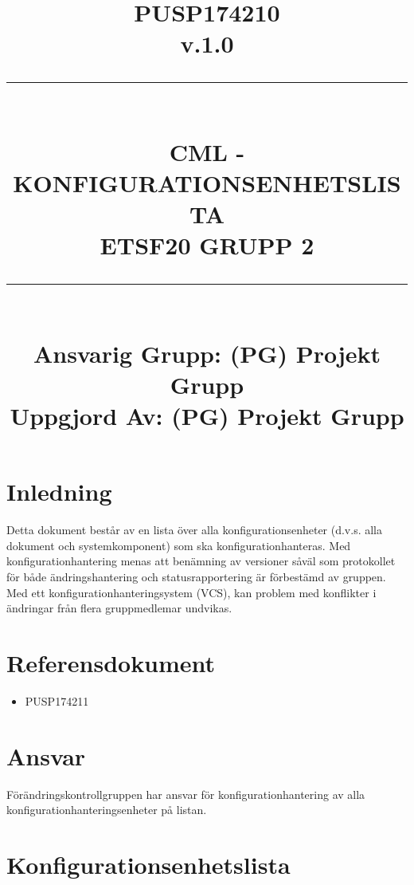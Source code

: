 \documentclass[paper=a4, fontsize=11pt,twoside]{article}
\title{
		\documentNumber{#1}																						
		\documentVersion{#2}																				
		\HRule{0.5pt} \\ %
		\LARGE \textbf{\uppercase{#3}} \\
		\large \textbf{\uppercase{ETSF20 Grupp 2}} 
		\HRule{2pt} \\ [1.5cm]    
		\normalsize            
		\documentResponsible{#4} \\ 
		\documentCreator{#4}  
	}
\newcommand{\HRule}[1]{\rule{\linewidth}{#1}}
\newcommand{\documentNumber}[1]{\centering PUSP1742#1 \\[1.0cm]}
\newcommand{\documentVersion}[1]{\centering \small{v.#1} \\[1.0cm]}
\newcommand{\documentResponsible}[1]{\centering  Ansvarig Grupp: #1}
\newcommand{\documentCreator}[1]{\centering Uppgjord Av: #1}
\newcommand{\grouptitlepage}[4]{ 
	\title{
		\documentNumber{#1}																						
		\documentVersion{#2}																				
		\HRule{0.5pt} \\ %
		\LARGE \textbf{\uppercase{#3}} \\
		\large \textbf{\uppercase{ETSF20 Grupp 2}} 
		\HRule{2pt} \\ [1.5cm]    
		\normalsize            
		\documentResponsible{#4} \\ 
		\documentCreator{#4}  
	}																							
	\maketitle																							
	\thispagestyle{empty} 																					
	\newpage 
}
\begin{document}
\grouptitlepage
{10}  %
{1.0}
{CML - Konfigurationsenhetslista}
{(PG) Projekt Grupp}	
\tableofcontents
\section{Inledning}
Detta dokument består av en lista över alla konfigurationsenheter (d.v.s. alla dokument och systemkomponent) som ska konfigurationhanteras. Med konfigurationhantering menas att benämning av versioner såväl som protokollet för både ändringshantering och statusrapportering är förbestämd av gruppen. Med ett konfigurationhanteringsystem (VCS), kan problem med konflikter i ändringar från flera gruppmedlemar undvikas.

\section{Referensdokument}
\begin{itemize}
\item PUSP174211
\end{itemize}

\section{Ansvar}
Förändringskontrollgruppen har ansvar för konfigurationhantering av alla konfigurationhanteringsenheter på listan.

\section{Konfigurationsenhetslista}
\end{document}
